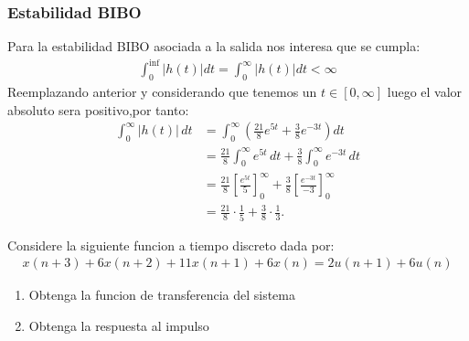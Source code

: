 \documentclass[
  11pt,
  letterpaper,
   addpoints,
   answers
  ]{exam}
\begin{document}
\begin{questions}
\begin{solution}
    \subsubsection*{Estabilidad BIBO}
    Para la estabilidad BIBO asociada a la salida nos interesa que se cumpla:
    \begin{align}
        \int_{0}^{\inf}|h(t)|dt= \int_{0}^{\infty} |h(t)| dt < \infty
    \end{align}
    Reemplazando anterior y considerando que tenemos un $t \in [0,\infty]$ luego el valor absoluto sera positivo,por tanto:
    \begin{align}
        \int_{0}^{\infty} |h(t)| \, dt &= \int_{0}^{\infty} \left( \frac{21}{8} e^{5t} + \frac{3}{8} e^{-3t} \right) dt \\
        &= \frac{21}{8} \int_{0}^{\infty} e^{5t} \, dt + \frac{3}{8} \int_{0}^{\infty} e^{-3t} \, dt \\
        &= \frac{21}{8} \left[ \frac{e^{5t}}{5} \right]_{0}^{\infty} + \frac{3}{8} \left[ \frac{e^{-3t}}{-3} \right]_{0}^{\infty} \\
        &= \frac{21}{8} \cdot \frac{1}{5} + \frac{3}{8} \cdot \frac{1}{3}.
    \end{align}
  
\end{solution}
    \question Considere la siguiente funcion a tiempo discreto dada por:
    \begin{align}
        x(n+3) + 6x(n+2) + 11x(n+1) + 6x(n) = 2u(n+1) + 6u(n) 
    \end{align}
    \begin{enumerate}
        \item Obtenga la funcion de transferencia del sistema 
        \item Obtenga la respuesta al impulso 
    \end{enumerate}
    \begin{solution}

\end{solution}
\end{questions}
\end{document}
